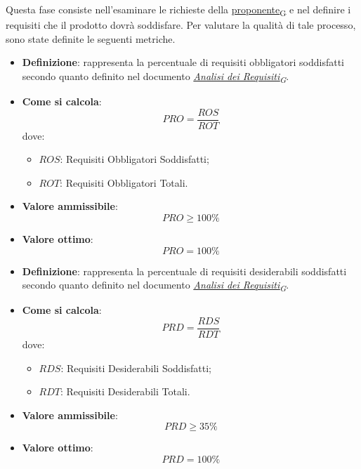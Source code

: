 Questa fase consiste nell'esaminare le richieste della \href{https://7last.github.io/docs/rtb/documentazione-interna/glossario\#proponente}{proponente\textsubscript{G}} e nel definire i requisiti che il prodotto dovrà soddisfare. Per valutare la qualità di tale processo, sono state definite le seguenti metriche.

\begin{itemize}
	\item \textbf{Definizione}: rappresenta la percentuale di requisiti obbligatori soddisfatti secondo quanto definito nel documento \href{https://7last.github.io/docs/rtb/documentazione-interna/glossario\#analisi-dei-requisiti}{\textit{Analisi dei Requisiti\textsubscript{G}}}.
	\item \textbf{Come si calcola}: \begin{equation*}PRO = \frac{ROS}{ROT}\end{equation*} dove:
		\begin{itemize}
			\item $ROS$: Requisiti Obbligatori Soddisfatti;
			\item $ROT$: Requisiti Obbligatori Totali.
		\end{itemize}
	\item \textbf{Valore ammissibile}: \begin{equation*}PRO \geq 100\%\end{equation*}
	\item \textbf{Valore ottimo}: \begin{equation*}PRO = 100\%\end{equation*}
\end{itemize}

\begin{itemize}
	\item \textbf{Definizione}: rappresenta la percentuale di requisiti desiderabili soddisfatti secondo quanto definito nel documento \href{https://7last.github.io/docs/rtb/documentazione-interna/glossario\#analisi-dei-requisiti}{\textit{Analisi dei Requisiti\textsubscript{G}}}.
	\item \textbf{Come si calcola}: \begin{equation*}PRD = \frac{RDS}{RDT}\end{equation*} dove:
		\begin{itemize}
			\item $RDS$: Requisiti Desiderabili Soddisfatti;
			\item $RDT$: Requisiti Desiderabili Totali.
		\end{itemize}
	\item \textbf{Valore ammissibile}: \begin{equation*}PRD \geq 35\%\end{equation*}
	\item \textbf{Valore ottimo}: \begin{equation*}PRD = 100\%\end{equation*}
\end{itemize}

